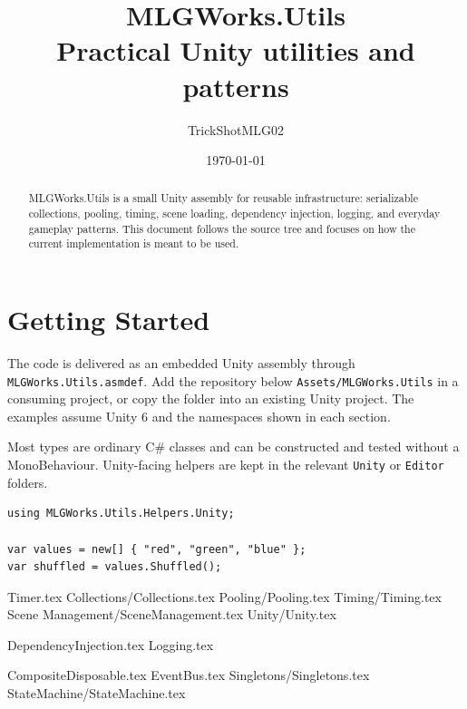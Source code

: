 \documentclass[11pt]{article}
\title{MLGWorks.Utils\\[0.3em]\large Practical Unity utilities and patterns}
\author{TrickShotMLG02}
\date{\today}
\begin{document}
\maketitle
\begin{abstract}
MLGWorks.Utils is a small Unity assembly for reusable infrastructure: serializable collections, pooling, timing, scene loading, dependency injection, logging, and everyday gameplay patterns. This document follows the source tree and focuses on how the current implementation is meant to be used.
\end{abstract}

\tableofcontents
\newpage

\section{Getting Started}
The code is delivered as an embedded Unity assembly through \texttt{MLGWorks.Utils.asmdef}. Add the repository below \texttt{Assets/MLGWorks.Utils} in a consuming project, or copy the folder into an existing Unity project. The examples assume Unity 6 and the namespaces shown in each section.

Most types are ordinary C\# classes and can be constructed and tested without a MonoBehaviour. Unity-facing helpers are kept in the relevant \texttt{Unity} or \texttt{Editor} folders.

\begin{lstlisting}
using MLGWorks.Utils.Helpers.Unity;

var values = new[] { "red", "green", "blue" };
var shuffled = values.Shuffled();
\end{lstlisting}

\newpage

\clearpage
{Timer.tex}
\clearpage
{Collections/Collections.tex}
\clearpage
{Pooling/Pooling.tex}
\clearpage
{Timing/Timing.tex}
\clearpage
{Scene Management/SceneManagement.tex}
\clearpage
{Unity/Unity.tex}

\clearpage
{DependencyInjection.tex}
\clearpage
{Logging.tex}

\clearpage
{CompositeDisposable.tex}
\clearpage
{EventBus.tex}
\clearpage
{Singletons/Singletons.tex}
\clearpage
{StateMachine/StateMachine.tex}
\end{document}
